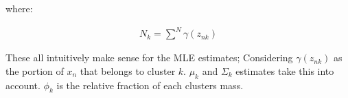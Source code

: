 \documentclass[]{article}
\begin{document}
where:

\begin{align}
N_k = \sum^N \gamma(z_{nk})
\end{align}

These all intuitively make sense for the MLE estimates; Considering $\gamma(z_{nk})$ as the portion of $x_n$ that belongs to cluster $k$. $\mu_k$ and $\Sigma_k$ estimates take this into account. $\phi_k$ is the relative fraction of each clusters mass.  
\end{document}
